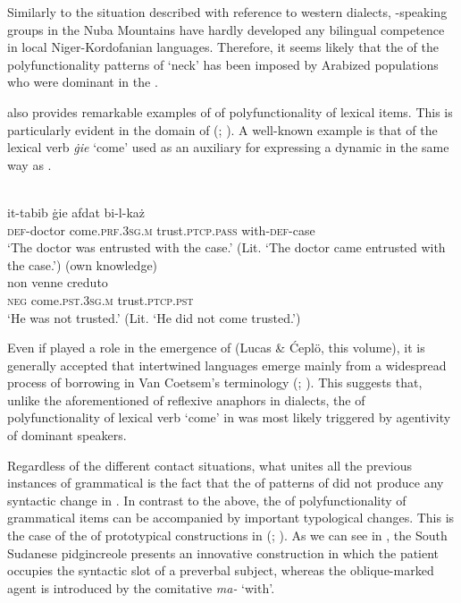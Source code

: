 \documentclass[output=paper]{langsci/langscibook}
\begin{document}
Similarly to the situation described with reference to western  dialects, -speaking groups in the Nuba Mountains have hardly developed any bilingual competence in local Niger-Kordofanian languages. Therefore, it seems likely that the  of the polyfunctionality patterns of ‘neck’ has been imposed by Arabized populations who were dominant in the . 

 also provides remarkable examples of  of polyfunctionality of lexical items. This is particularly evident in the domain of  (\citealt{Vanhove1993}; \citealt{VanhoveCaubet2009}). A well-known example is that of the lexical verb \textit{\.gie} ‘come’ used as an auxiliary for expressing a dynamic   in the same way as  .

\ea\label{23}
{ \citep[214]{BorgAzzopardi-Alexander1997}}\\
\gll   it-tabib \.gie afdat bi-l-każ\\
       \textsc{def}-doctor come.\textsc{prf.3sg.m} trust.\textsc{ptcp.pass} with-\textsc{def}-case\\
\glt   `The doctor was entrusted with the case.' (Lit. ‘The doctor came entrusted with the case.’)
\ex \label{24}
{ (own knowledge)} \\
\gll   non venne creduto\\
       \textsc{neg} come.\textsc{pst.3sg.m} trust.\textsc{ptcp.pst}\\
\glt   `He was not trusted.' (Lit. ‘He did not come trusted.’)
\z

Even if  played a role in the emergence of  (Lucas \& Ćeplö, this volume), it is generally accepted that intertwined languages emerge mainly from a widespread process of borrowing in Van Coetsem’s terminology (\citealt[397]{Winford2005}; \citealt{Manfredi2018}). This suggests that, unlike the aforementioned  of reflexive anaphors in  dialects, the  of polyfunctionality of lexical verb ‘come’ in  was most likely triggered by agentivity of  dominant speakers. 

Regardless of the different contact situations, what unites all the previous instances of grammatical  is the fact that the  of patterns of  did not produce any syntactic change in . In contrast to the above, the  of polyfunctionality of grammatical items can be accompanied by important typological changes. This is the case of the  of prototypical  constructions in   (\citealt[92]{Manfredi2017}; \citeyear[415]{Manfredi2018}). As we can see in , the South Sudanese pidgincreole presents an innovative  construction in which the patient occupies the syntactic slot of a preverbal subject, whereas the oblique-marked agent is introduced by the comitative  \textit{ma-} ‘with’.  
\end{document}
